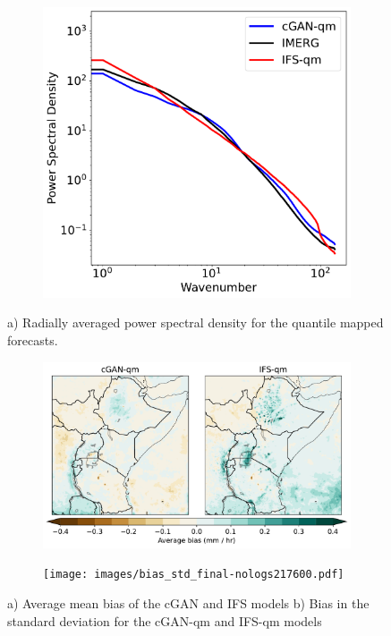 \documentclass{article}
\begin{document}
\begin{figure}[!ht]
     \centering
     \begin{subfigure}{0.48\textwidth}
     \includegraphics[width=\textwidth]{images/rapsd_final-nologs_217600.pdf}
     \caption{}
     \end{subfigure}
     
     \caption{a) Radially averaged power spectral density for the quantile mapped forecasts. 
}
     \label{fig:rapsd}
\end{figure}

\begin{figure}[!ht]
    \centering
    \begin{subfigure}{0.8\textwidth}
    \centering
     \includegraphics[width=\textwidth]{images/bias_final-nologs217600.pdf}
     \caption{}
     \end{subfigure}
     \begin{subfigure}{0.8\textwidth}
    \centering
     \texttt{[image: images/bias\_std\_final-nologs217600.pdf]}
     \caption{}
     \end{subfigure}
    
     \caption{a) Average mean bias of the cGAN and IFS models b) Bias in the standard deviation for the cGAN-qm and IFS-qm models }
     \label{fig:bias}
\end{figure}
\end{document}
